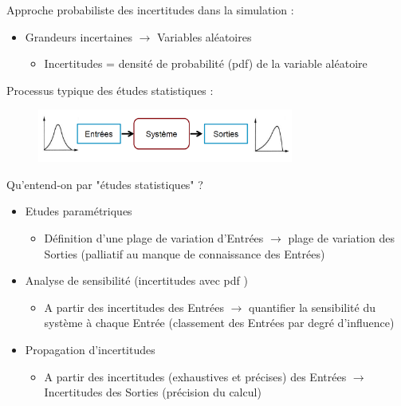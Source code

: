 \begin{frame}[fragile]

Approche probabiliste des incertitudes dans la simulation :
\begin{itemize}
\item Grandeurs incertaines \(\rightarrow\) Variables aléatoires
\begin{itemize}
\item Incertitudes = densité de probabilité (pdf) de la variable aléatoire
\end{itemize}
\end{itemize}

Processus typique des études statistiques :


\begin{figure}
\centering \includegraphics[width=0.75\textwidth]{Figures/Stat_1.png} 
\end{figure}


\end{frame}


\begin{frame}[fragile]
Qu'entend-on par "études statistiques" ?
\begin{itemize}
\item Etudes paramétriques
\begin{itemize}
\item Définition d’une plage de variation d’Entrées
\(\rightarrow\) plage de variation des Sorties
(palliatif au manque de connaissance des Entrées)
\end{itemize}
\item Analyse de sensibilité (incertitudes avec pdf )

\begin{itemize}
\item A partir des incertitudes des Entrées
\(\rightarrow\) quantifier la sensibilité du système à chaque Entrée
(classement des Entrées par degré d’influence)
\end{itemize}

\item Propagation d’incertitudes
\begin{itemize}
\item A partir des incertitudes (exhaustives et précises) des Entrées
\(\rightarrow\) Incertitudes des Sorties
(précision du calcul)
\end{itemize}

\end{itemize}

\end{frame}




